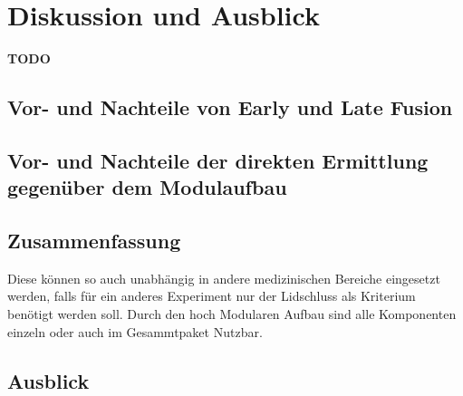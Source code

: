 \chapter{Diskussion und Ausblick}\label{discussion}

\textbf{TODO}


\section{Vor- und Nachteile von Early und Late Fusion}\label{early_vs_late}


\section{Vor- und Nachteile der direkten Ermittlung gegenüber dem Modulaufbau}\label{di_vs_module}

\section{Zusammenfassung}\label{conclude}

Diese können so auch unabhängig in andere medizinischen Bereiche eingesetzt werden, falls für ein anderes Experiment nur der Lidschluss als Kriterium benötigt werden soll. Durch den hoch Modularen Aufbau sind alle Komponenten einzeln oder auch im Gesammtpaket Nutzbar.


\section{Ausblick}\label{next}
